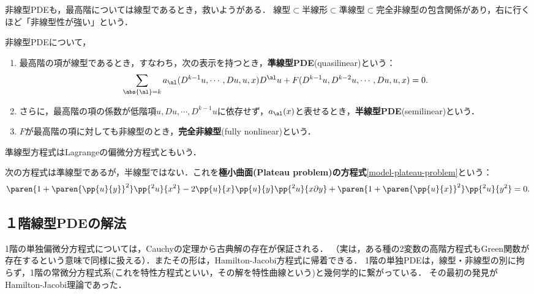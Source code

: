 \documentclass[uplatex,dvipdfmx]{jsreport}
\begin{document}
\begin{tcolorbox}[colframe=ForestGreen, colback=ForestGreen!10!white,breakable,colbacktitle=ForestGreen!40!white,coltitle=black,fonttitle=\bfseries\sffamily,
title=]
    非線型PDEも，最高階については線型であるとき，救いようがある．
    線型$\subset$半線形$\subset$準線型$\subset$完全非線型の包含関係があり，右に行くほど「非線型性が強い」という．
\end{tcolorbox}

\begin{definition}
    非線型PDEについて，
    \begin{enumerate}
        \item 最高階の項が線型であるとき，すなわち，次の表示を持つとき，\textbf{準線型PDE}(quasilinear)という：
        \[\sum_{\abs{\al}=k}a_\al(D^{k-1}u,\cdots,Du,u,x)D^\al u+F(D^{k-1}u,D^{k-2}u,\cdots,Du,u,x)=0.\]
        \item さらに，最高階の項の係数が低階項$u,Du,\cdots,D^{k-1}u$に依存せず，$a_\al(x)$と表せるとき，\textbf{半線型PDE}(semilinear)という．
        \item $F$が最高階の項に対しても非線型のとき，\textbf{完全非線型}(fully nonlinear)という．
    \end{enumerate}
\end{definition}
\begin{remark}
    準線型方程式はLagrangeの偏微分方程式ともいう．
\end{remark}

\begin{example}
    次の方程式は準線型であるが，半線型ではない．これを\textbf{極小曲面(Plateau problem)の方程式}\ref{model-plateau-problem}という：
    \[\paren{1+\paren{\pp{u}{y}}^2}\pp{^2u}{x^2}-2\pp{u}{x}\pp{u}{y}\pp{^2u}{x\partial y}+\paren{1+\paren{\pp{u}{x}}^2}\pp{^2u}{y^2}=0.\]
\end{example}

\subsection{１階線型PDEの解法}

\begin{tcolorbox}[colframe=ForestGreen, colback=ForestGreen!10!white,breakable,colbacktitle=ForestGreen!40!white,coltitle=black,fonttitle=\bfseries\sffamily,
title=]
    1階の単独偏微分方程式については，Cauchyの定理から古典解の存在が保証される．
    （実は，ある種の2変数の高階方程式もGreen関数が存在するという意味で同様に扱える）．またその形は，Hamilton-Jacobi方程式に帰着できる．
    1階の単独PDEは，線型・非線型の別に拘らず，1階の常微分方程式系(これを特性方程式といい，その解を特性曲線という)と幾何学的に繋がっている．
    その最初の発見がHamilton-Jacobi理論であった．
\end{tcolorbox}
\end{document}
